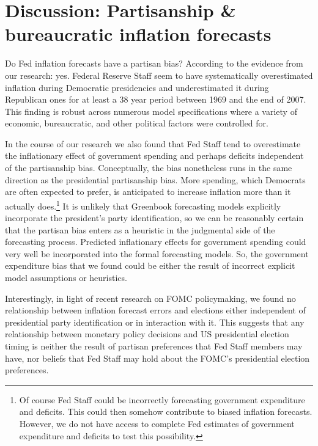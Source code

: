 \documentclass[a4paper]{article}\usepackage{graphicx, color}
\begin{document}
\section*{Discussion: Partisanship \& bureaucratic inflation forecasts}

Do Fed inflation forecasts have a partisan bias? According to the evidence from our research: yes. Federal Reserve Staff seem to have systematically overestimated inflation during Democratic presidencies and underestimated it during Republican ones for at least a 38 year period between 1969 and the end of 2007. This finding is robust across numerous model specifications where a variety of economic, bureaucratic, and other political factors were controlled for. 

In the course of our research we also found that Fed Staff tend to overestimate the inflationary effect of government spending and perhaps deficits independent of the partisanship bias. Conceptually, the bias nonetheless runs in the same direction as the presidential partisanship bias. More spending, which Democrats are often expected to prefer, is anticipated to increase inflation more than it actually does.\footnote{Of course Fed Staff could be incorrectly forecasting government expenditure and deficits. This could then somehow contribute to biased inflation forecasts. However, we do not have access to complete Fed estimates of government expenditure and deficits to test this possibility.} It is unlikely that Greenbook forecasting models explicitly incorporate the president's party identification, so we can be reasonably certain that the partisan bias enters as a heuristic in the judgmental side of the forecasting process. Predicted inflationary effects for government spending could very well be incorporated into the formal forecasting models. So, the government expenditure bias that we found could be either the result of incorrect explicit model assumptions or heuristics.

Interestingly, in light of recent research on FOMC policymaking, we found no relationship between inflation forecast errors and elections either independent of presidential party identification or in interaction with it. This suggests that any relationship between monetary policy decisions and US presidential election timing is neither the result of partisan preferences that Fed Staff members may have, nor beliefs that Fed Staff may hold about the FOMC's presidential election preferences. 
\end{document}
